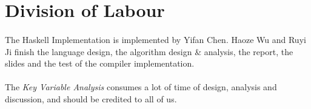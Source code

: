\documentclass[a4paper]{article}
\begin{document}
\section{Division of Labour}
\paragraph{}
The Haskell Implementation is implemented by Yifan Chen. Haoze Wu and Ruyi Ji finish the language design, the algorithm design \& analysis, the report, the slides and the test of the compiler implementation.
\paragraph{}
The \emph{Key Variable Analysis} consumes a lot of time of design, analysis and discussion, and should be credited to all of us.
\end{document}
